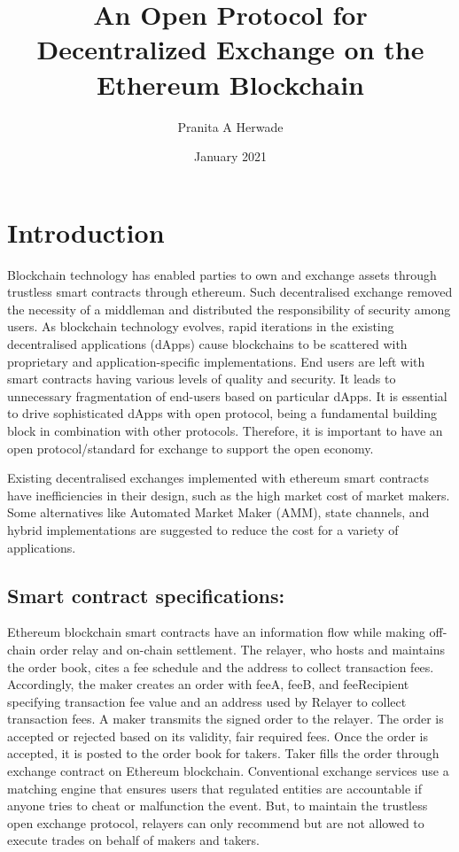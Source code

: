 \documentclass{article}
\begin{document}
\title{An Open Protocol for Decentralized Exchange on the Ethereum Blockchain}
\author{Pranita A Herwade}
\date{January 2021}

\maketitle 

\section{Introduction}
Blockchain technology has enabled parties to own and exchange assets through trustless smart contracts through ethereum. Such decentralised exchange removed the necessity of a middleman and distributed the responsibility of security among users. As blockchain technology evolves, rapid iterations in the existing decentralised applications (dApps) cause blockchains to be scattered with proprietary and application-specific implementations. End users are left with smart contracts having various levels of quality and security. It leads to unnecessary fragmentation of end-users based on particular dApps. It is essential to drive sophisticated dApps with open protocol, being a fundamental building block in combination with other protocols. Therefore, it is important to have an open protocol/standard for exchange to support the open economy.

Existing decentralised exchanges implemented with ethereum smart contracts have inefficiencies in their design, such as the high market cost of market makers. Some alternatives like Automated Market Maker (AMM), state channels, and hybrid implementations are suggested to reduce the cost for a variety of applications.  

\subsection{Smart contract specifications:}
Ethereum blockchain smart contracts have an information flow while making off-chain order relay and on-chain settlement. The relayer, who hosts and maintains the order book, cites a fee schedule and the address to collect transaction fees. Accordingly, the maker creates an order with feeA, feeB, and feeRecipient specifying transaction fee value and an address used by Relayer to collect transaction fees. A maker transmits the signed order to the relayer. The order is accepted or rejected based on its validity, fair required fees. Once the order is accepted, it is posted to the order book for takers. Taker fills the order through exchange contract on Ethereum blockchain. Conventional exchange services use a matching engine that ensures users that regulated entities are accountable if anyone tries to cheat or malfunction the event. But, to maintain the trustless open exchange protocol, relayers can only recommend but are not allowed to execute trades on behalf of makers and takers. 
\end{document}
